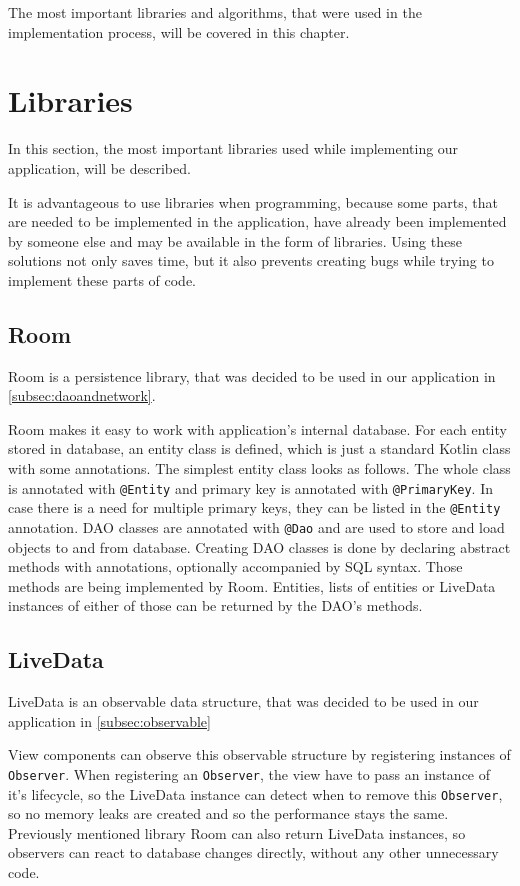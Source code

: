 The most important libraries and algorithms, that were used in the implementation process, will be covered in this chapter.

\section{Libraries}
In this section, the most important libraries used while implementing our application, will be described.

It is advantageous to use libraries when programming, because some parts, that are needed to be implemented in the application, have already been implemented by someone else and may be available in the form of libraries.
Using these solutions not only saves time, but it also prevents creating bugs while trying to implement these parts of code.

\subsection{Room}
Room is a persistence library, that was decided to be used in our application in \autoref{subsec:daoandnetwork}.

Room makes it easy to work with application's internal database.
For each entity stored in database, an entity class is defined, which is just a standard Kotlin class with some annotations.
The simplest entity class looks as follows.
The whole class is annotated with \verb|@Entity| and primary key is annotated with \verb|@PrimaryKey|.
In case there is a need for multiple primary keys, they can be listed in the \verb|@Entity| annotation.
DAO classes are annotated with \verb|@Dao| and are used to store and load objects to and from database.
Creating DAO classes is done by declaring abstract methods with annotations, optionally accompanied by SQL syntax.
Those methods are being implemented by Room.
Entities, lists of entities or LiveData instances of either of those can be returned by the DAO's methods.

\subsection{LiveData}
LiveData is an observable data structure, that was decided to be used in our application in \autoref{subsec:observable}

View components can observe this observable structure by registering instances of \verb|Observer|.
When registering an \verb|Observer|, the view have to pass an instance of it's lifecycle, so the LiveData instance can detect when to remove this \verb|Observer|, so no memory leaks are created and so the performance stays the same.
Previously mentioned library Room can also return LiveData instances, so observers can react to database changes directly, without any other unnecessary code.

